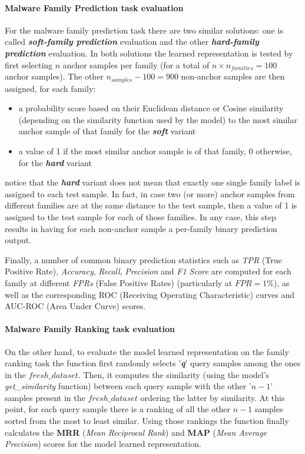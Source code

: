 \documentclass[pdfa%
,cucitura%
]{toptesi}
\begin{document}
\paragraph{Malware Family Prediction task evaluation}\label{par:FamilyPredictionEvaluation}
For the malware family prediction task there are two similar solutions: one is called \textit{\textbf{soft-family prediction}} evaluation and the other \textit{\textbf{hard-family prediction}} evaluation. In both solutions the learned representation is tested by first selecting $n$ anchor samples per family (for a total of $n \times n_{families} = 100$ anchor samples). The other $n_{samples} - 100 = 900$ non-anchor samples are then assigned, for each family:
\begin{itemize}
	\item a probability score based on their Euclidean distance or Cosine similarity (depending on the similarity function used by the model) to the most similar anchor sample of that family for the \textit{\textbf{soft}} variant
	
	\item a value of 1 if the most similar anchor sample is of that family, 0 otherwise, for the \textit{\textbf{hard}} variant
\end{itemize}
notice that the \textit{\textbf{hard}} variant does not mean that exactly one single family label is assigned to each test sample. In fact, in case two (or more) anchor samples from different families are at the same distance to the test sample, then a value of 1 is assigned to the test sample for each of those families. In any case, this step results in having for each non-anchor sample a per-family binary prediction output.

Finally, a number of common binary prediction statistics such as \textit{TPR} (True Positive Rate), \textit{Accuracy}, \textit{Recall}, \textit{Precision} and \textit{F1 Score} are computed for each family at different \textit{FPRs} (False Positive Rates) (particularly at $FPR=1\%$), as well as the corresponding ROC (Receiving Operating Characteristic) curves and AUC-ROC (Area Under Curve) scores.

\paragraph{Malware Family Ranking task evaluation}\label{par:FamilyRankingEvaluation}
On the other hand, to evaluate the model learned representation on the family ranking task the function
first randomly selects '\textit{\textbf{q}}' query samples among the ones in the $fresh\_dataset$. Then, it computes the similarity (using the model's \textit{get\_similarity} function) between each query sample with the other '$n-1$' samples present in the $fresh\_dataset$ ordering the latter by similarity. At this point, for each query sample there is a ranking of all the other $n-1$ samples sorted from the most to least similar. Using those rankings the function finally calculates the \textbf{MRR} (\textit{Mean Reciprocal Rank}) and \textbf{MAP} (\textit{Mean Average Precision}) scores for the model learned representation.
\end{document}
